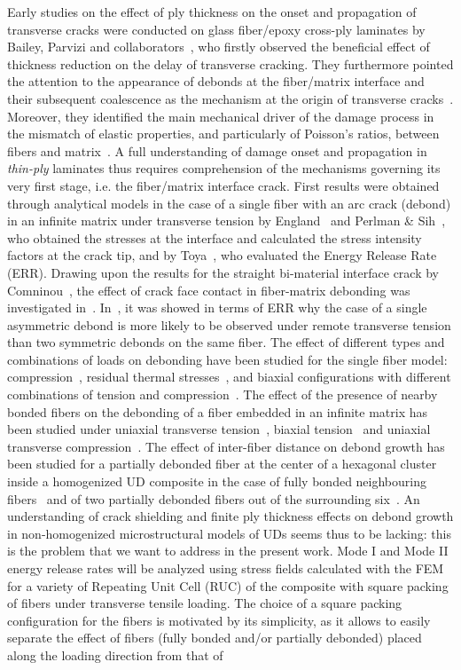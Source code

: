 Early studies on the effect of ply thickness on the onset and propagation of transverse cracks were conducted on glass fiber/epoxy cross-ply laminates by Bailey, Parvizi and collaborators~\cite{Garrett1977,Parvizi1978a,Parvizi1978b}, who firstly observed the beneficial effect of thickness reduction on the delay of transverse cracking. They furthermore pointed the attention to the appearance of debonds at the fiber/matrix interface and their subsequent coalescence as the mechanism at the origin of transverse cracks~\cite{Bailey1981}. Moreover, they identified the main mechanical driver of the damage process in the mismatch of elastic properties, and particularly of Poisson's ratios, between fibers and matrix~\cite{Bailey1979}. A full understanding of damage onset and propagation in \emph{thin-ply} laminates thus requires comprehension of the mechanisms governing its very first stage, i.e. the fiber/matrix interface crack. First results were obtained through analytical models in the case of a single fiber with an arc crack (debond) in an infinite matrix under transverse tension by England~\cite{England1966} and Perlman \& Sih~\cite{Perlman1967}, who obtained the stresses at the interface and calculated the stress intensity factors at the crack tip, and by Toya~\cite{Toya1974}, who evaluated the Energy Release Rate (ERR). Drawing upon the results for the straight bi-material interface crack by Comninou~\cite{Comninou1977}, the effect of crack face contact in fiber-matrix debonding was investigated in~\cite{Paris1996,Varna1997a}. In~\cite{Garcia2015}, it was showed in terms of ERR why the case of a single asymmetric debond is more likely to be observed under remote transverse tension than two symmetric debonds on the same fiber. The effect of different types and combinations of loads on debonding have been studied for the single fiber model: compression~\cite{Correa2007}, residual thermal stresses~\cite{Correa2011}, and biaxial configurations with different combinations of tension and compression~\cite{Correa2013, Correa2014}. The effect of the presence of nearby bonded fibers on the debonding of a fiber embedded in an infinite matrix has been studied under uniaxial transverse tension~\cite{Sandino2016}, biaxial tension~\cite{Sandino2016b} and uniaxial transverse compression~\cite{Sandino2018}. The effect of inter-fiber distance on debond growth has been studied for a partially debonded fiber at the center of a hexagonal cluster inside a homogenized UD composite in the case of fully bonded neighbouring fibers~\cite{Zhuang2018} and of two partially debonded fibers out of the surrounding six~\cite{Varna2017}. An understanding of crack shielding and finite ply thickness effects on debond growth in non-homogenized microstructural models of UDs seems thus to be lacking: this is the problem that we want to address in the present work. Mode I and Mode II energy release rates will be analyzed using stress fields calculated with the FEM for a variety of Repeating Unit Cell (RUC) of the composite with square packing of fibers under transverse tensile loading. The choice of a square packing configuration for the fibers is motivated by its simplicity, as it allows to easily separate the effect of fibers (fully bonded and/or partially debonded) placed along the loading direction from that of 